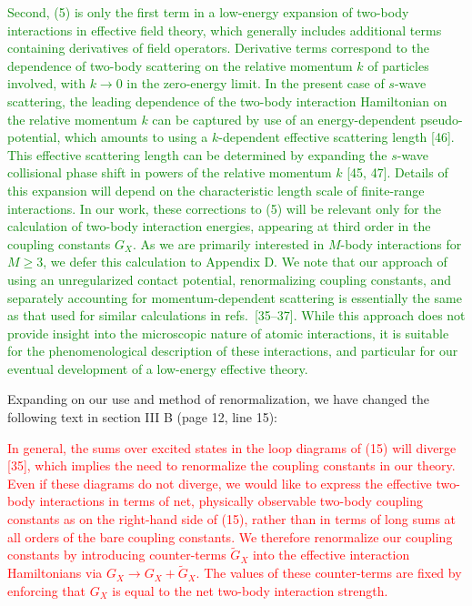 \documentclass[preprint]{revtex4-1}
\newcommand{\1}{\mathds{1}}
\newcommand{\red}[1]{\textcolor{red}{#1}}
\newcommand{\green}[1]{\textcolor{green}{#1}}
\begin{document}
\begin{enumerate}
  \green{Second, (5) is only the first term in a low-energy expansion
    of two-body interactions in effective field theory, which
    generally includes additional terms containing derivatives of
    field operators.  Derivative terms correspond to the dependence of
    two-body scattering on the relative momentum $k$ of particles
    involved, with $k\to0$ in the zero-energy limit.  In the present
    case of $s$-wave scattering, the leading dependence of the
    two-body interaction Hamiltonian on the relative momentum $k$ can
    be captured by use of an energy-dependent pseudo-potential, which
    amounts to using a $k$-dependent effective scattering length [46].
    This effective scattering length can be determined by expanding
    the $s$-wave collisional phase shift in powers of the relative
    momentum $k$ [45, 47].  Details of this expansion will depend on
    the characteristic length scale of finite-range interactions.  In
    our work, these corrections to (5) will be relevant only for the
    calculation of two-body interaction energies, appearing at third
    order in the coupling constants $G_X$.  As we are primarily
    interested in $M$-body interactions for $M\ge3$, we defer this
    calculation to Appendix D.  We note that our approach of using an
    unregularized contact potential, renormalizing coupling constants,
    and separately accounting for momentum-dependent scattering is
    essentially the same as that used for similar calculations in
    refs.~[35--37].  While this approach does not provide insight into
    the microscopic nature of atomic interactions, it is suitable for
    the phenomenological description of these interactions, and
    particular for our eventual development of a low-energy effective
    theory.}

  Expanding on our use and method of renormalization, we have changed
  the following text in section III B (page 12, line 15):

  \red{In general, the sums over excited states in the loop diagrams
    of (15) will diverge [35], which implies the need to renormalize
    the coupling constants in our theory.  Even if these diagrams do
    not diverge, we would like to express the effective two-body
    interactions in terms of net, physically observable two-body
    coupling constants as on the right-hand side of (15), rather than
    in terms of long sums at all orders of the bare coupling
    constants.  We therefore renormalize our coupling constants by
    introducing counter-terms $\tilde G_X$ into the effective
    interaction Hamiltonians via $G_X\to G_X+\tilde G_X$.  The values
    of these counter-terms are fixed by enforcing that $G_X$ is equal
    to the net two-body interaction strength.}


\end{enumerate}
\end{document}
